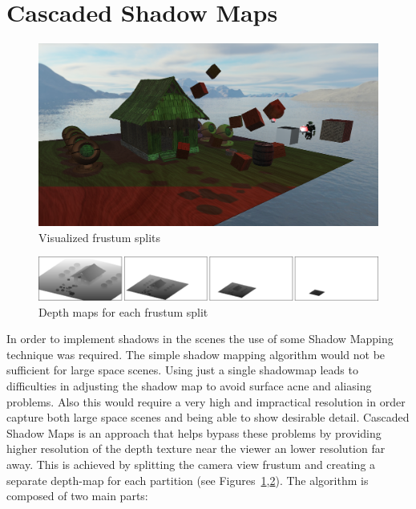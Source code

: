 \section{Cascaded Shadow Maps}

\begin{figure}[h]
    \centering
    \includegraphics[scale=0.25, clip=true]{./image/csmsplits.png}
    \caption{Visualized frustum splits}
\label{fig:csmsplits}
\end{figure}

\begin{figure}[b]
    \centering
    \includegraphics[scale=0.3, clip=true]{./image/csmbufs.png}
    \caption{Depth maps for each frustum split}
\label{fig:csmbufs}
\end{figure}

In order to implement shadows in the scenes the use of some Shadow Mapping technique was required.
The simple shadow mapping algorithm would not be sufficient for large space scenes. Using just
a single shadowmap leads to difficulties in adjusting the shadow map to avoid surface acne and aliasing
problems. Also this would require a very high and impractical resolution in order capture both large
space scenes and being able to show desirable detail. Cascaded Shadow Maps is an approach that helps bypass
these problems by providing higher resolution of the depth texture near the viewer an lower resolution far
away. This is achieved by splitting the camera view frustum and creating a separate depth-map for each
partition (see Figures~\ref{fig:csmsplits},\ref{fig:csmbufs}). The algorithm is composed of two main parts:

